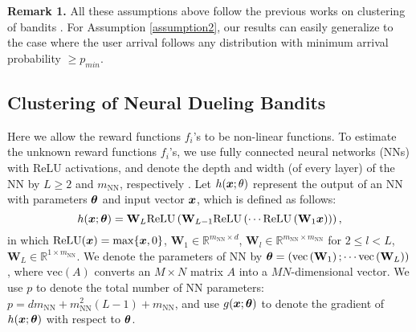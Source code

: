 \noindent\textbf{Remark 1.} All these assumptions above
follow the previous works on clustering of bandits \cite{gentile2014online,gentile2017context,
li2018online,
ban2021local,
liu2022federated,wang2024onlinea,wang2024onlineb}.
For Assumption \ref{assumption2}, our results can easily generalize to the case where the user arrival follows any distribution with minimum arrival probability 
$\geq p_{min}$. 


\subsection{Clustering of Neural Dueling Bandits}
\label{subsec:problem:setting:neural}
Here we allow the reward functions $f_i$'s 
to be non-linear functions.
To estimate the unknown reward functions $f_i$'s, we use fully connected neural networks (NNs) with 
ReLU activations, and denote the depth and width (of every layer) of the NN by $L\geq 2$ and $m_{\text{NN}}$, respectively \cite{zhou2020neural,zhang2020neural}.
Let $h(\boldsymbol{x};\theta)$ represent the output of an NN with parameters $\boldsymbol{\theta}$ and input vector $\boldsymbol{x}$, which is defined as follows:
\[
    h(\boldsymbol{x};\boldsymbol{\theta}) = \mathbf{W}_L \text{ReLU}\left( \mathbf{W}_{L-1} \text{ReLU}\left( \cdots \text{ReLU}\left(\mathbf{W}_1 \boldsymbol{x}\right) \right) \right),
\]
in which $\text{ReLU}(\boldsymbol{x}) = \max\{ \boldsymbol{x}, 0 \}$, $\mathbf{W}_1 \in \mathbb{R}^{m_{\text{NN}} \times d}$, $\mathbf{W}_l \in \mathbb{R}^{m_{\text{NN}} \times m_{\text{NN}}}$ for $2 \le l < L$, $\mathbf{W}_L \in \mathbb{R}^{1\times m_{\text{NN}}}$. 
We denote the parameters of NN by $\boldsymbol{\theta} = \left( \text{vec}\left( \mathbf{W}_1 \right);\cdots \text{vec}\left( \mathbf{W}_L \right) \right)$, where $\text{vec}\left( A \right)$ converts an $M \times N$ matrix $A$ into a $MN$-dimensional vector.
We 
use $p$ to denote the total number of NN parameters: $p = dm_{\text{NN}} + m_{\text{NN}}^2(L-1) + m_{\text{NN}}$, and use $g(\boldsymbol{x};\boldsymbol{\theta})$ to denote the gradient of $h(\boldsymbol{x};\boldsymbol{\theta})$ with respect to $\boldsymbol{\theta}$.

